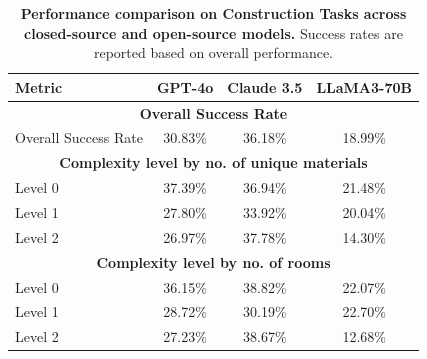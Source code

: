 \begin{table}
\centering
\small
\setlength{\tabcolsep}{4pt} %
\renewcommand{\arraystretch}{1.2} %
\begin{tabular}{lccc}
\toprule
\textbf{Metric} & \textbf{GPT-4o}  & \textbf{Claude 3.5} & \textbf{LLaMA3-70B}  \\
\midrule
\multicolumn{4}{c}{\textbf{Overall Success Rate}} \\
\midrule
Overall Success Rate  & 30.83\%  & 36.18\%  & 18.99\%   \\
\midrule
\multicolumn{4}{c}{\textbf{Complexity level by no. of unique materials}} \\
\midrule
Level 0  & 37.39\%  & 36.94\%  & 21.48\%   \\
Level 1  & 27.80\%  & 33.92\%  & 20.04\%   \\
Level 2  & 26.97\%  & 37.78\%  & 14.30\%   \\
\midrule
\multicolumn{4}{c}{\textbf{Complexity level by no. of rooms}} \\
\midrule
Level 0  & 36.15\%  & 38.82\%  & 22.07\%   \\
Level 1  & 28.72\%  & 30.19\%  & 22.70\%   \\
Level 2  & 27.23\%  & 38.67\%  & 12.68\%   \\
\bottomrule
\end{tabular}
\caption{\textbf{Performance comparison on Construction Tasks across closed-source and open-source models.} Success rates are reported based on overall performance.}
\label{tab:construction-success-rates}
\end{table}
